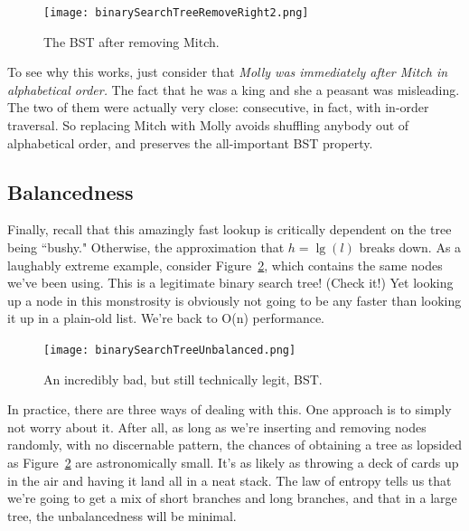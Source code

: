 \begin{figure}[ht]
\centering
\texttt{[image: binarySearchTreeRemoveRight2.png]}
\caption{The BST after removing Mitch.}
\label{bstremoveright2}
\end{figure}

To see why this works, just consider that \textit{Molly was immediately
after Mitch in alphabetical order.} The fact that he was a king and she a
peasant was misleading. The two of them were actually very close:
consecutive, in fact, with in-order traversal. So replacing Mitch with
Molly avoids shuffling anybody out of alphabetical order, and preserves the
all-important BST property.

\subsection{Balancedness}

Finally, recall that this amazingly fast lookup is critically dependent on
the tree being ``bushy." Otherwise, the approximation that $h=\lg(l)$
breaks down. As a laughably extreme example, consider
Figure~\ref{bstunbalanced}, which contains the same nodes we've been using.
This is a legitimate binary search tree! (Check it!) Yet looking up a node
in this monstrosity is obviously not going to be any faster than looking it
up in a plain-old list. We're back to O(n) performance.

\begin{figure}[ht]
\centering
\texttt{[image: binarySearchTreeUnbalanced.png]}
\caption{An incredibly bad, but still technically legit, BST.}
\label{bstunbalanced}
\end{figure}

In practice, there are three ways of dealing with this. One approach is to
simply not worry about it. After all, as long as we're inserting and
removing nodes randomly, with no discernable pattern, the chances of
obtaining a tree as lopsided as Figure~\ref{bstunbalanced} are
astronomically small. It's as likely as throwing a deck of cards up in the
air and having it land all in a neat stack. The law of entropy tells us
that we're going to get a mix of short branches and long branches, and that
in a large tree, the unbalancedness will be minimal.

